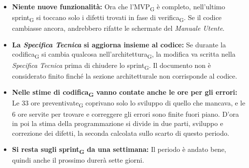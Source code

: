 ﻿\documentclass[a4paper, 10pt, colorlinks=true, linkcolor=black, urlcolor=blue, citecolor=blue, hidelinks]{article}
\begin{document}
\begin{itemize}
    \item \textbf{Niente nuove funzionalità:} Ora che l'MVP\textsubscript{G} è completo, nell'ultimo sprint\textsubscript{G} si toccano solo i difetti trovati in fase di verifica\textsubscript{G}. Se il codice cambiasse ancora, andrebbero rifatte le schermate del \textit{Manuale Utente}.

    \item \textbf{La \textit{Specifica Tecnica} si aggiorna insieme al codice:} Se durante la codifica\textsubscript{G} si cambia qualcosa nell'architettura\textsubscript{G}, la modifica va scritta nella \textit{Specifica Tecnica} prima di chiudere lo sprint\textsubscript{G}. Il documento non è considerato finito finché la sezione architetturale non corrisponde al codice.

    \item \textbf{Nelle stime di codifica\textsubscript{G} vanno contate anche le ore per gli errori:} Le 33 ore preventivate\textsubscript{G} coprivano solo lo sviluppo di quello che mancava, e le 6 ore servite per trovare e correggere gli errori sono finite fuori piano. D'ora in poi la stima della programmazione si divide in due parti, sviluppo e correzione dei difetti, la seconda calcolata sullo scarto di questo periodo.

    \item \textbf{Si resta sugli sprint\textsubscript{G} da una settimana:} Il periodo è andato bene, quindi anche il prossimo durerà sette giorni.
\end{itemize}
\end{document}
